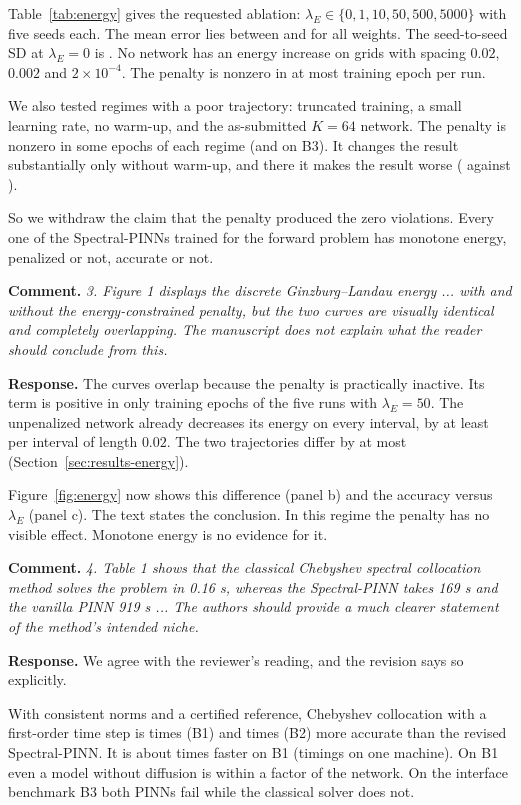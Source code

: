\documentclass[11pt]{article}
\newcommand{\rc}[1]{\par\medskip\noindent\textbf{Comment.} \emph{#1}\par\smallskip\noindent\textbf{Response.} }
\begin{document}
Table~\ref{tab:energy} gives the requested ablation: $\lambda_E\in\{0,1,10,50,500,5000\}$ with five seeds each. The mean error lies between  and  for all weights. The seed-to-seed SD at $\lambda_E=0$ is . No network has an energy increase on grids with spacing $0.02$, $0.002$ and $2\times10^{-4}$. The penalty is nonzero in at most  training epoch per run.

We also tested regimes with a poor trajectory: truncated training, a small learning rate, no warm-up, and the as-submitted $K=64$ network. The penalty is nonzero in some epochs of each regime (and on B3). It changes the result substantially only without warm-up, and there it makes the result worse ( against ).

So we withdraw the claim that the penalty produced the zero violations. Every one of the  Spectral-PINNs trained for the forward problem has monotone energy, penalized or not, accurate or not.

\rc{3. Figure 1 displays the discrete Ginzburg--Landau energy ... with and without the energy-constrained penalty, but the two curves are visually identical and completely overlapping. The manuscript does not explain what the reader should conclude from this.}
The curves overlap because the penalty is practically inactive. Its term is positive in only  training epochs of the five runs with $\lambda_E=50$. The unpenalized network already decreases its energy on every interval, by at least  per interval of length $0.02$. The two trajectories differ by at most  (Section~\ref{sec:results-energy}).

Figure~\ref{fig:energy} now shows this difference (panel b) and the accuracy versus $\lambda_E$ (panel c). The text states the conclusion. In this regime the penalty has no visible effect. Monotone energy is no evidence for it.

\rc{4. Table 1 shows that the classical Chebyshev spectral collocation method solves the problem in 0.16 s, whereas the Spectral-PINN takes 169 s and the vanilla PINN 919 s ... The authors should provide a much clearer statement of the method's intended niche.}
We agree with the reviewer's reading, and the revision says so explicitly.

With consistent norms and a certified reference, Chebyshev collocation with a first-order time step is  times (B1) and  times (B2) more accurate than the revised Spectral-PINN. It is about  times faster on B1 (timings on one machine). On B1 even a model without diffusion is within a factor  of the network. On the interface benchmark B3 both PINNs fail while the classical solver does not.
\end{document}

